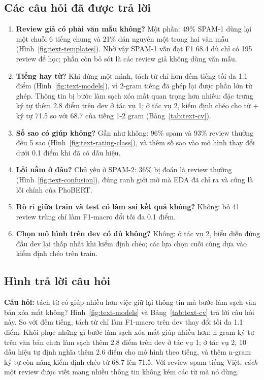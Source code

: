 \subsection{Các câu hỏi đã được trả lời}
\begin{enumerate}[leftmargin=1.5cm]
    \item \textbf{Review giả có phải văn mẫu không?} Một phần: 49\% SPAM-1 dùng lại một chuỗi 6 tiếng chung và 21\% dán nguyên một trong hai văn mẫu
          (Hình~\ref{fig:text-templates}). Nhờ vậy SPAM-1 vẫn đạt F1 68.4 dù chỉ có 195 review để học; phần còn bỏ sót là các review giả không dùng văn mẫu.
    \item \textbf{Tiếng hay từ?} Khi đứng một mình, tách từ chỉ hơn đếm tiếng tối đa 1.1 điểm (Hình~\ref{fig:text-models}), vì 2-gram tiếng đã ghép lại được
          phần lớn từ ghép. Thông tin bị bước làm sạch xóa mất quan trọng hơn nhiều: đặc trưng ký tự thêm 2.8 điểm trên dev ở tác vụ 1; ở tác vụ 2, kiểm định
          chéo cho từ + ký tự 71.5 so với 68.7 của tiếng 1-2 gram (Bảng~\ref{tab:text-cv}).
    \item \textbf{Số sao có giúp không?} Gần như không: 96\% spam và 93\% review thường đều 5 sao (Hình~\ref{fig:text-rating-class}), và thêm số sao vào mô hình
          thay đổi dưới 0.1 điểm khi đã có dấu hiệu.
    \item \textbf{Lỗi nằm ở đâu?} Chủ yếu ở SPAM-2: 36\% bị đoán là review thường (Hình~\ref{fig:text-confusion}), đúng ranh giới mờ mà EDA đã chỉ ra và cũng là lỗi chính của PhoBERT.
    \item \textbf{Rò rỉ giữa train và test có làm sai kết quả không?} Không: bỏ 41 review trùng chỉ làm F1-macro đổi tối đa 0.1 điểm.
    \item \textbf{Chọn mô hình trên dev có đủ không?} Không: ở tác vụ 2, biểu diễn đứng đầu dev lại thấp nhất khi kiểm định chéo; các lựa chọn cuối cùng dựa vào kiểm định chéo trên train.
\end{enumerate}

\subsection{Hình trả lời câu hỏi}
\textbf{Câu hỏi:} tách từ có giúp nhiều hơn việc giữ lại thông tin mà bước làm sạch văn bản xóa mất không?
Hình~\ref{fig:text-models} và Bảng~\ref{tab:text-cv} trả lời câu hỏi này. So với đếm tiếng, tách từ chỉ làm F1-macro trên dev thay đổi tối đa 1.1 điểm.
Khôi phục những gì bước làm sạch xóa mất giúp nhiều hơn: n-gram ký tự trên văn bản chưa làm sạch thêm 2.8 điểm trên dev ở tác vụ 1; ở tác vụ 2,
10 dấu hiệu tự định nghĩa thêm 2.6 điểm cho mô hình theo tiếng, và thêm n-gram ký tự còn nâng kiểm định chéo từ 68.7 lên 71.5.
Với review spam tiếng Việt, \emph{cách} một review được viết mang nhiều thông tin không kém các từ mà nó dùng.

